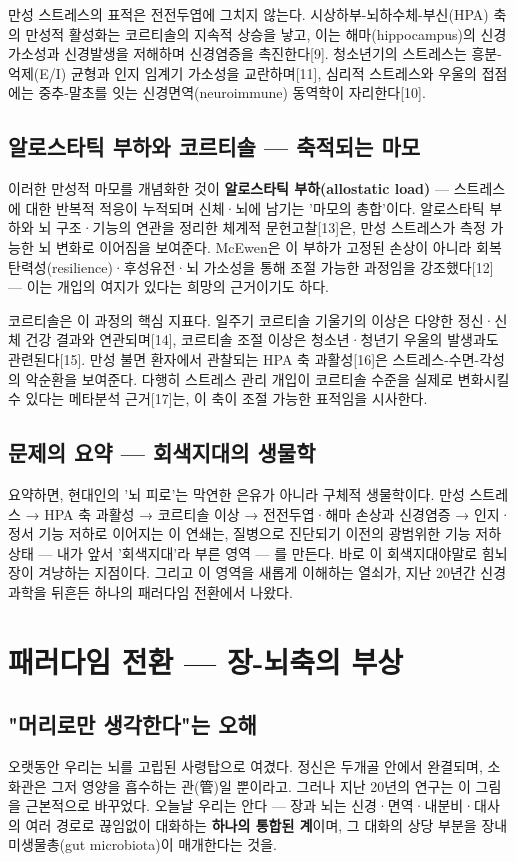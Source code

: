 \documentclass[11pt,oneside]{book}
\begin{document}
만성 스트레스의 표적은 전전두엽에 그치지 않는다. 시상하부-뇌하수체-부신(HPA) 축의 만성적 활성화는 코르티솔의 지속적 상승을 낳고, 이는 해마(hippocampus)의 신경가소성과 신경발생을 저해하며 신경염증을 촉진한다[9]. 청소년기의 스트레스는 흥분-억제(E/I) 균형과 인지 임계기 가소성을 교란하며[11], 심리적 스트레스와 우울의 접점에는 중추-말초를 잇는 신경면역(neuroimmune) 동역학이 자리한다[10].

\subsection{알로스타틱 부하와 코르티솔 — 축적되는 마모}
이러한 만성적 마모를 개념화한 것이 \textbf{알로스타틱 부하(allostatic load)} — 스트레스에 대한 반복적 적응이 누적되며 신체·뇌에 남기는 '마모의 총합'이다. 알로스타틱 부하와 뇌 구조·기능의 연관을 정리한 체계적 문헌고찰[13]은, 만성 스트레스가 측정 가능한 뇌 변화로 이어짐을 보여준다. McEwen은 이 부하가 고정된 손상이 아니라 회복탄력성(resilience)·후성유전·뇌 가소성을 통해 조절 가능한 과정임을 강조했다[12] — 이는 개입의 여지가 있다는 희망의 근거이기도 하다.

코르티솔은 이 과정의 핵심 지표다. 일주기 코르티솔 기울기의 이상은 다양한 정신·신체 건강 결과와 연관되며[14], 코르티솔 조절 이상은 청소년·청년기 우울의 발생과도 관련된다[15]. 만성 불면 환자에서 관찰되는 HPA 축 과활성[16]은 스트레스-수면-각성의 악순환을 보여준다. 다행히 스트레스 관리 개입이 코르티솔 수준을 실제로 변화시킬 수 있다는 메타분석 근거[17]는, 이 축이 조절 가능한 표적임을 시사한다.

\subsection{문제의 요약 — 회색지대의 생물학}
요약하면, 현대인의 '뇌 피로'는 막연한 은유가 아니라 구체적 생물학이다. 만성 스트레스 → HPA 축 과활성 → 코르티솔 이상 → 전전두엽·해마 손상과 신경염증 → 인지·정서 기능 저하로 이어지는 이 연쇄는, 질병으로 진단되기 이전의 광범위한 기능 저하 상태 — 내가 앞서 '회색지대'라 부른 영역 — 를 만든다. 바로 이 회색지대야말로 힘뇌장이 겨냥하는 지점이다. 그리고 이 영역을 새롭게 이해하는 열쇠가, 지난 20년간 신경과학을 뒤흔든 하나의 패러다임 전환에서 나왔다.

\section{패러다임 전환 — 장-뇌축의 부상}
\subsection{"머리로만 생각한다"는 오해}
오랫동안 우리는 뇌를 고립된 사령탑으로 여겼다. 정신은 두개골 안에서 완결되며, 소화관은 그저 영양을 흡수하는 관(管)일 뿐이라고. 그러나 지난 20년의 연구는 이 그림을 근본적으로 바꾸었다. 오늘날 우리는 안다 — 장과 뇌는 신경·면역·내분비·대사의 여러 경로로 끊임없이 대화하는 \textbf{하나의 통합된 계}이며, 그 대화의 상당 부분을 장내미생물총(gut microbiota)이 매개한다는 것을.
\end{document}
